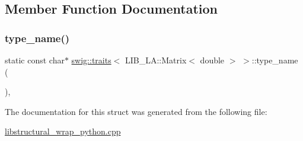 \subsection{Member Function Documentation}
\mbox{\label{structswig_1_1traits_3_01_l_i_b___l_a_1_1_matrix_3_01double_01_4_01_4_a07a2319d73c1dab5e16980e3e7776342}} 
\subsubsection{\texorpdfstring{type\+\_\+name()}{type\_name()}}
{\footnotesize\ttfamily static const char$\ast$ \hyperlink{structswig_1_1traits}{swig\+::traits}$<$ L\+I\+B\+\_\+\+L\+A\+::\+Matrix$<$ double $>$ $>$\+::type\+\_\+name (\begin{DoxyParamCaption}{ }\end{DoxyParamCaption})\hspace{0.3cm}{\ttfamily [inline]}, {\ttfamily [static]}}



The documentation for this struct was generated from the following file\+:\begin{DoxyCompactItemize}
\item 
\hyperlink{libstructural__wrap__python_8cpp}{libstructural\+\_\+wrap\+\_\+python.\+cpp}\end{DoxyCompactItemize}
